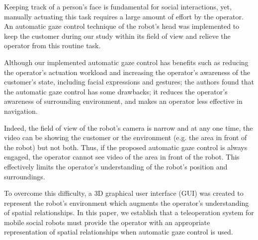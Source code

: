 \documentclass[journal]{IEEEtran}
\begin{document}
Keeping track of a person's face is fundamental for social interactions, yet, manually actuating this task requires a large amount of effort by the operator.
An automatic gaze control technique of the robot's head was implemented to keep the customer during our study within its field of view and relieve the operator from this routine task.

Although our implemented automatic gaze control has benefits such as reducing the operator's actuation workload and increasing the operator's awareness of the customer's state, including facial expressions and gestures; the authors found that the automatic gaze control has some drawbacks; it reduces the operator's awareness of surrounding environment, and makes an operator less effective in navigation.

Indeed, the field of view of the robot's camera is narrow and at any one time, the video can be showing the customer or the environment (e.g. the area in front of the robot) but not both. Thus, if the proposed automatic gaze control is always engaged, the operator cannot see video of the area in front of the robot. This effectively limits the operator's understanding of the robot's position and surroundings.

To overcome this difficulty, a 3D graphical user interface (GUI) was created to represent the robot's environment which augments the operator's understanding of spatial relationships.
In this paper, we establish that a teleoperation system for mobile social robots must provide the operator with an appropriate representation of spatial relationships when automatic gaze control is used.


\end{document}

